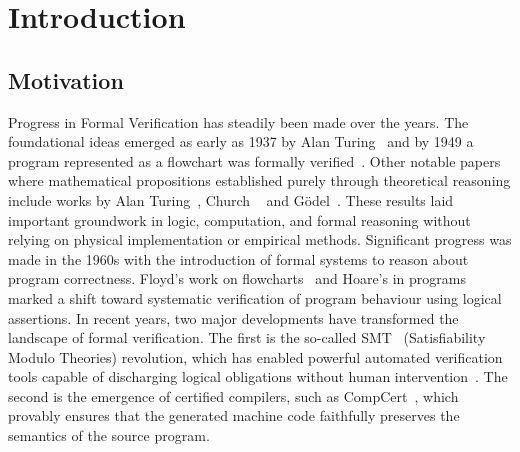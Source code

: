 
%

\chapter{Introduction}
\label{cha:introduction}


\section{Motivation}
\label{sec:Motivation}


Progress in Formal Verification has steadily been made over the years. 
The foundational ideas emerged as early as 1937 by Alan Turing~\cite{Turing37} and by 1949 a program
represented as a flowchart was formally verified~\cite{early-proof}. Other notable papers where mathematical propositions 
established purely through theoretical reasoning include works by Alan Turing~\cite{Turing38}, Church
~\cite{church-unsolvableproblemof-1936} and Gödel~\cite{ZACH2005917}. These results laid important 
groundwork in logic, computation, and formal reasoning without relying on physical implementation or empirical methods.
Significant progress was made in the 1960s with the introduction of formal systems to reason about program correctness. 
Floyd's work on flowcharts~\cite{Floyd93} and Hoare's in programs~\cite{Hoare69} marked a shift toward systematic verification of 
program behaviour using logical assertions.
In recent years, two major developments have transformed the landscape of formal verification. The first is the so-called SMT~\cite{abs-1711-10641} 
(Satisfiability Modulo Theories) revolution, which has enabled powerful automated verification tools capable of discharging 
logical obligations without human intervention~\cite{Barrett2018}. The second is the emergence of certified compilers, such as 
CompCert~\cite{Leroy09-back-end}, which provably ensures that the generated machine code faithfully preserves the semantics of the source 
program.


